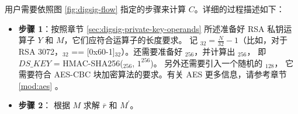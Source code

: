 \documentclass[main\_\_CN.tex]{subfiles}
\begin{document}
用户需要依照图 \ref{fig:digsig-flow} 指定的步骤来计算 \begin{math}C\end{math}。详细的过程描述如下：

\begin{itemize}

    \item {\bfseries 步骤 1}：按照章节 \ref{sec:digsig-private-key-operands} 所述准备好 RSA 私钥运算子 \begin{math}Y\end{math} 和 \begin{math}M\end{math}，它们应符合运算子的长度要求。
          记 \begin{math}[L]_{32} = \frac{N}{32}-1 \end{math}（比如，对于 RSA 3072，\begin{math}[L]_{32}\end{math} == [0x60-1]\begin{math}_{32}\end{math}）。还需要准备好 \begin{math}[HMAC\_KEY]_{256}\end{math}，并计算出 \begin{math}[DS\_KEY]_{256}\end{math}， 即 \begin{math}DS\_KEY\end{math} = HMAC-SHA256(\begin{math}[HMAC\_KEY]_{256}\end{math}, \begin{math}1^{256}\end{math})。 另外还需要引入一个随机的 \begin{math}[IV]_{128}\end{math}， 它需要符合 AES-CBC 块加密算法的要求。有关 AES 更多信息，请参考章节 \ref{mod:aes} \textit{}。 
    
    \item {\bfseries 步骤 2}：
          根据 \begin{math}M\end{math} 求解 \begin{math}\overline{r}\end{math} 和 \begin{math}M^{\prime} \end{math}。
    

\end{itemize}
\end{document}
